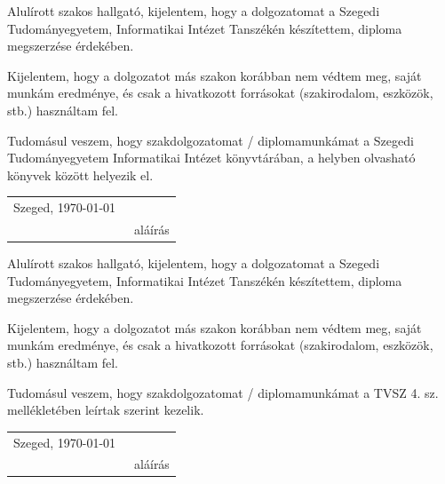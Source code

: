 \documentclass[12pt, a4paper]{report}
\theoremstyle{definition}
\begin{document}
	
	
	\noindent
	Alulírott \makebox[4cm]{\dotfill} szakos hallgató, kijelentem, hogy a dolgozatomat a Szegedi Tudományegyetem, Informatikai Intézet \makebox[4cm]{\dotfill} Tanszékén készítettem, \makebox[4cm]{\dotfill} diploma megszerzése érdekében.
	
	Kijelentem, hogy a dolgozatot más szakon korábban nem védtem meg, saját munkám eredménye, és csak a hivatkozott forrásokat (szakirodalom, eszközök, stb.) használtam fel.
	
	Tudomásul veszem, hogy szakdolgozatomat / diplomamunkámat a Szegedi Tudományegyetem Informatikai Intézet könyvtárában, a helyben olvasható könyvek között helyezik el.
	
	\vspace*{2cm}
	
	\begin{tabular}{lc}
		Szeged, \today\
		\hspace{2cm} & \makebox[6cm]{\dotfill} \\
		& aláírás \\
	\end{tabular}
	
	
	\vspace*{4cm}
	
	
	\noindent
	Alulírott \makebox[4cm]{\dotfill} szakos hallgató, kijelentem, hogy a dolgozatomat a Szegedi Tudományegyetem, Informatikai Intézet \makebox[4cm]{\dotfill} Tanszékén készítettem, \makebox[4cm]{\dotfill} diploma megszerzése érdekében.
	
	Kijelentem, hogy a dolgozatot más szakon korábban nem védtem meg, saját munkám eredménye, és csak a hivatkozott forrásokat (szakirodalom, eszközök, stb.) használtam fel.
	
	Tudomásul veszem, hogy szakdolgozatomat / diplomamunkámat a TVSZ 4. sz. mellékletében leírtak szerint kezelik.
	
	\vspace*{2cm}
	
	\begin{tabular}{lc}
		Szeged, \today\
		\hspace{2cm} & \makebox[6cm]{\dotfill} \\
		& aláírás \\
	\end{tabular}
	
\end{document}
